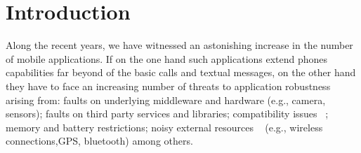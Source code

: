 \documentclass[conference]{IEEEtran}
\begin{document}





\section{Introduction}

Along the recent years, we have witnessed an astonishing increase in the number of
mobile applications. If on the one hand such applications extend phones capabilities 
far beyond of the basic calls and textual messages, on the other hand
they have to face an increasing number of threats to application robustness
 arising from: faults on underlying middleware and hardware (e.g., camera, sensors);
faults on third party services and libraries; compatibility issues ~\cite{McDon13}; 
 memory and battery restrictions; noisy external resources ~\cite{Zhang12} (e.g., wireless connections,GPS, bluetooth) among others. 
\end{document}
